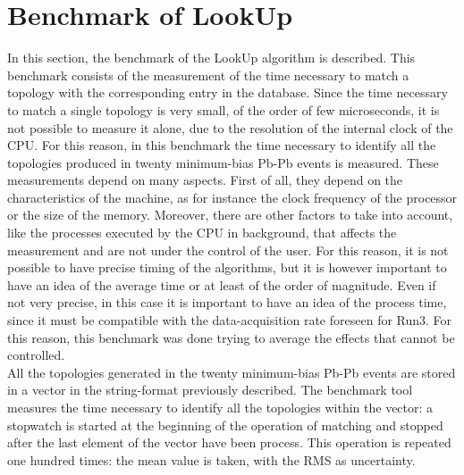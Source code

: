 \section{Benchmark of LookUp}
In this section, the benchmark of the LookUp algorithm is described. This benchmark consists of the measurement of the time necessary to match a topology with the corresponding entry in the database. Since the time necessary to match a single topology is very small, of the order of few microseconds, it is not possible to measure it alone, due to the resolution of the internal clock of the CPU. For this reason, in this benchmark the time necessary to identify all the topologies produced in twenty minimum-bias Pb-Pb events is measured. These measurements depend on many aspects. First of all, they depend on the characteristics of the machine, as for instance the clock frequency of the processor or the size of the memory. Moreover, there are other factors to take into account, like the processes executed by the CPU in background, that affects the measurement and are not under the control of the user. For this reason, it is not possible to have precise timing of the algorithms, but it is however important to have an idea of the average time or at least of the order of magnitude. Even if not very precise, in this case it is important to have an idea of the process time, since it must be compatible with the data-acquisition rate foreseen for Run3. For this reason, this benchmark was done trying to average the effects that cannot be controlled.\\
All the topologies generated in the twenty minimum-bias Pb-Pb events are stored in a vector in the string-format previously described. The benchmark tool measures the time necessary to identify all the topologies within the vector: a stopwatch is started at the beginning of the operation of matching and stopped after the last element of the vector have been process. This operation is repeated one hundred times: the mean value is taken, with the RMS as uncertainty.
%
